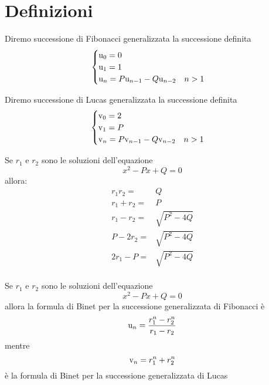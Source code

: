 \section{Definizioni}
\begin{defn}
	Diremo successione di Fibonacci generalizzata la successione definita
	\begin{equation}
		\begin{cases}
			\mathrm{u}_{0}=0\\
			\mathrm{u}_{1}=1\\
			\mathrm{u}_{n}=P\mathrm{u}_{n-1}-Q\mathrm{u}_{n-2}\quad n>1\\
		\end{cases}
	\end{equation} 
\end{defn}\cite{Rabinowitz_1996}
\begin{defn}
	Diremo successione di Lucas generalizzata la successione definita
	\begin{equation}
		\begin{cases}
			\mathrm{v}_{0}=2\\
			\mathrm{v}_{1}=P\\
			\mathrm{v}_{n}=P\mathrm{v}_{n-1}-Q\mathrm{v}_{n-2}\quad n>1\\
		\end{cases}
	\end{equation}
\end{defn}\cite{Rabinowitz_1996}
\begin{lem}[Proprietà]
	Se $r_{1}$ e $r_{2}$ sono le soluzioni dell'equazione \begin{equation}
		x^2-Px+Q=0
	\end{equation} allora:
	\begin{align*}
		r_{1}r_{2}=&{}Q\\
		r_{1}+r_{2}=&{}P\\
		r_{1}-r_{2}=&{}\sqrt{P^2-4Q}\\
		P-2r_{2}=&{}\sqrt{P^2-4Q}\\
		2r_{1}-P=&{}\sqrt{P^2-4Q}\\
	\end{align*}
\end{lem}  
\begin{thm}\label{thm:FormulaBinetgeneralizzatarr}
	Se $r_{1}$ e 	$r_{2}$ sono le soluzioni dell'equazione \begin{equation}
		x^2-Px+Q=0
	\end{equation} allora la formula di Binet per la successione
	generalizzata 
	di Fibonacci è \begin{equation}
		\mathrm{u}_{n}=\dfrac{r_{1}^n-r_{2}^n}{r_{1}-r_{2}}
	\end{equation}
	mentre \begin{equation}
		\mathrm{v}_{n}=r_{1}^n+r_{2}^n
	\end{equation}
	è la formula di Binet per la successione generalizzata di Lucas 
\end{thm}\cite{Rabinowitz_1996}
